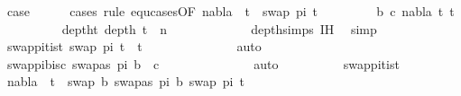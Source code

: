 \begin{isabellebody}
\ {\isacharquery}{\kern0pt}case\ \isanewline
\ \ \ \ \isamarkupfalse%
{\isacharparenleft}{\kern0pt}cases\ rule{\isacharcolon}{\kern0pt}\ equ{\isachardot}{\kern0pt}cases{\isacharbrackleft}{\kern0pt}OF\ {\isacartoucheopen}nabla\ {\isasymturnstile}\ t\ {\isasymapprox}\ swap\ pi\ t{\isacartoucheclose}{\isacharbrackright}{\kern0pt}{\isacharparenright}{\kern0pt}\isanewline
\ \ \ \ \ \ \isamarkupfalse%
\ {\isacharparenleft}{\kern0pt}{}\ b\ c\ nabla\ t{}\ t{}{\isacharparenright}{\kern0pt}\isanewline
\ \ \ \ \ \ \ \ \isamarkupfalse%
\ deptht{}{\isacharcolon}{\kern0pt}\ {\isachardoublequoteopen}depth\ t{}\ {\isacharless}{\kern0pt}\ n{\isachardoublequoteclose}\isanewline
\ \ \ \ \ \ \ \ \ \ \isamarkupfalse%
\ {}\ depth{\isachardot}{\kern0pt}simps{\isacharparenleft}{\kern0pt}{}{\isacharparenright}{\kern0pt}\ IH\ \isamarkupfalse%
\ simp\isanewline
\ \ \ \ \ \ \ \ \isamarkupfalse%
\ swap{\isacharunderscore}{\kern0pt}pi{\isacharunderscore}{\kern0pt}t{}{\isacharunderscore}{\kern0pt}is{\isacharunderscore}{\kern0pt}t{}{\isacharcolon}{\kern0pt}\ {\isachardoublequoteopen}swap\ pi\ t{}\ {\isacharequal}{\kern0pt}\ t{}{\isachardoublequoteclose}\isanewline
\ \ \ \ \ \ \ \ \ \ \isamarkupfalse%
\ {}{\isacharparenleft}{\kern0pt}{}{\isacharcomma}{\kern0pt}{}{\isacharparenright}{\kern0pt}\ \isamarkupfalse%
\ auto\isanewline
\ \ \ \ \ \ \ \ \isamarkupfalse%
\ swap{\isacharunderscore}{\kern0pt}pi{\isacharunderscore}{\kern0pt}b{\isacharunderscore}{\kern0pt}is{\isacharunderscore}{\kern0pt}c{\isacharcolon}{\kern0pt}\ {\isachardoublequoteopen}swapas\ pi\ b\ {\isacharequal}{\kern0pt}\ c{\isachardoublequoteclose}\isanewline
\ \ \ \ \ \ \ \ \ \ \isamarkupfalse%
\ {}{\isacharparenleft}{\kern0pt}{}{\isacharcomma}{\kern0pt}{}{\isacharparenright}{\kern0pt}\ \isamarkupfalse%
\ auto\isanewline
\ \ \ \ \ \ \ \ \isamarkupfalse%
\ swap{\isacharunderscore}{\kern0pt}pi{\isacharunderscore}{\kern0pt}t{}{\isacharunderscore}{\kern0pt}is{\isacharunderscore}{\kern0pt}t{}\ \isamarkupfalse%
\ {\isachardoublequoteopen}nabla\ {\isasymturnstile}\ t{}\ {\isasymapprox}\ swap\ {\isacharbrackleft}{\kern0pt}{\isacharparenleft}{\kern0pt}b{\isacharcomma}{\kern0pt}\ swapas\ pi\ b{\isacharparenright}{\kern0pt}{\isacharbrackright}{\kern0pt}\ {\isacharparenleft}{\kern0pt}swap\ pi\ t{}{\isacharparenright}{\kern0pt}{\isachardoublequoteclose}\isanewline

\end{isabellebody}
